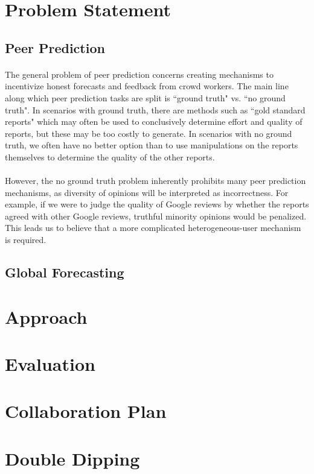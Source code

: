 \documentclass[a4paper, 11pt]{article}
\begin{document}
\maketitle


\section{Problem Statement}
\subsection{Peer Prediction} 
\paragraph{}The general problem of peer prediction concerns creating mechanisms to incentivize honest forecasts and feedback from crowd workers. The main line along which peer prediction tasks are split is ``ground truth" vs. ``no ground truth". In scenarios with ground truth, there are methods such as ``gold standard reports" which may often be used to conclusively determine effort and quality of reports, but these may be too costly to generate. In scenarios with no ground truth, we often have no better option than to use manipulations on the reports themselves to determine the quality of the other reports. 
\paragraph{}However, the no ground truth problem inherently prohibits many peer prediction mechanisms, as diversity of opinions will be interpreted as incorrectness. For example, if we were to judge the quality of Google reviews by whether the reports agreed with other Google reviews, truthful minority opinions would be penalized. This leads us to believe that a more complicated heterogeneous-user mechanism is required.
\subsection{Global Forecasting} 
\paragraph{}

\section{Approach}

\section{Evaluation}

\section{Collaboration Plan}

\section{Double Dipping}
\end{document}
